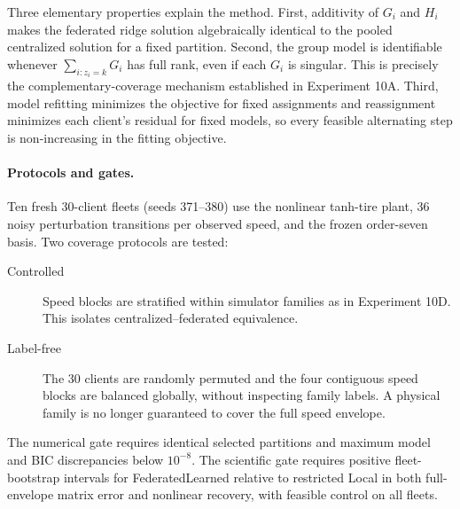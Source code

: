 Three elementary properties explain the method. First, additivity of $G_i$ and
$H_i$ makes the federated ridge solution algebraically identical to the pooled
centralized solution for a fixed partition. Second, the group model is
identifiable whenever $\sum_{i:z_i=k}G_i$ has full rank, even if each $G_i$ is
singular. This is precisely the complementary-coverage mechanism established
in Experiment 10A. Third, model refitting minimizes the objective for fixed
assignments and reassignment minimizes each client's residual for fixed models,
so every feasible alternating step is non-increasing in the fitting objective.

\paragraph{Protocols and gates.}
Ten fresh 30-client fleets (seeds 371--380) use the nonlinear tanh-tire plant,
36 noisy perturbation transitions per observed speed, and the frozen
order-seven basis. Two coverage protocols are tested:
\begin{description}
 \item[Controlled] Speed blocks are stratified within simulator families as in
 Experiment 10D. This isolates centralized--federated equivalence.
 \item[Label-free] The 30 clients are randomly permuted and the four contiguous
 speed blocks are balanced globally, without inspecting family labels. A
 physical family is no longer guaranteed to cover the full speed envelope.
\end{description}
The numerical gate requires identical selected partitions and maximum model
and BIC discrepancies below $10^{-8}$. The scientific gate requires positive
fleet-bootstrap intervals for FederatedLearned relative to restricted Local in
both full-envelope matrix error and nonlinear recovery, with feasible control
on all fleets.

